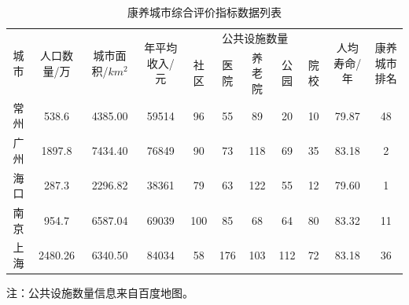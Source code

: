 \documentclass[12pt,a4paper]{article}
\begin{document}
\begin{table}[h]
  \centering
  \caption{康养城市综合评价指标数据列表}
  \begin{adjustbox}{width=\textwidth}
  \begin{tabular}{c|c|c|c|ccccc|c|c}
    \toprule[2pt]
    \multirow{2}{*}{城市} & \multirow{2}{*}{人口数量/万} & \multirow{2}{*}{城市面积/$km^2$}& \multirow{2}{*}{年平均收入/元}& \multicolumn{5}{c|}{公共设施数量} &\multirow{2}{*}{人均寿命/年}&\multirow{2}{*}{康养城市排名\cite{06}}\\
    \cline{5-9}
    & & & & 社区 & 医院 & 养老院 & 公园 & 院校 & &\\
    \midrule[1pt]
    常州 & 538.6 & 4385.00 &59514& 96 & 55 & 89 & 20 & 10 & 79.87 &48\\
    广州 & 1897.8 & 7434.40 &76849& 90 & 73 & 118 & 69 & 35 & 83.18 &2\\
    海口 & 287.3 & 2296.82 &38361& 79 & 63 & 122 & 55 & 12 & 79.60 &1\\
    南京 & 954.7 & 6587.04 &69039& 100 & 85 & 68 & 64 & 80 & 83.32 &11\\
    上海 & 2480.26 & 6340.50 &84034& 58 & 176 & 103 & 112 & 72 & 83.18 &36\\
    \bottomrule[2pt]
  \end{tabular}
  \end{adjustbox}

  \vspace{0.5em}
  {\footnotesize 注：公共设施数量信息来自百度地图。}
\end{table}
\end{document}
